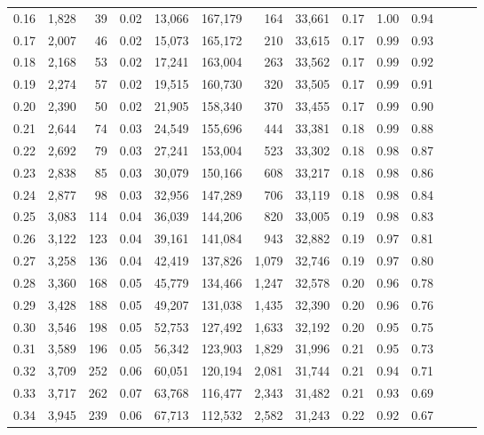 \begin{tabular}{rrrrrrrrrrrrrr}
0.16 &  1,828 &   39 &  0.02 &   13,066 &  167,179 &     164 &  33,661 &  0.17 &  1.00 &      0.94 \\
0.17 &  2,007 &   46 &  0.02 &   15,073 &  165,172 &     210 &  33,615 &  0.17 &  0.99 &      0.93 \\
0.18 &  2,168 &   53 &  0.02 &   17,241 &  163,004 &     263 &  33,562 &  0.17 &  0.99 &      0.92 \\
0.19 &  2,274 &   57 &  0.02 &   19,515 &  160,730 &     320 &  33,505 &  0.17 &  0.99 &      0.91 \\
0.20 &  2,390 &   50 &  0.02 &   21,905 &  158,340 &     370 &  33,455 &  0.17 &  0.99 &      0.90 \\
0.21 &  2,644 &   74 &  0.03 &   24,549 &  155,696 &     444 &  33,381 &  0.18 &  0.99 &      0.88 \\
0.22 &  2,692 &   79 &  0.03 &   27,241 &  153,004 &     523 &  33,302 &  0.18 &  0.98 &      0.87 \\
0.23 &  2,838 &   85 &  0.03 &   30,079 &  150,166 &     608 &  33,217 &  0.18 &  0.98 &      0.86 \\
0.24 &  2,877 &   98 &  0.03 &   32,956 &  147,289 &     706 &  33,119 &  0.18 &  0.98 &      0.84 \\
0.25 &  3,083 &  114 &  0.04 &   36,039 &  144,206 &     820 &  33,005 &  0.19 &  0.98 &      0.83 \\
0.26 &  3,122 &  123 &  0.04 &   39,161 &  141,084 &     943 &  32,882 &  0.19 &  0.97 &      0.81 \\
0.27 &  3,258 &  136 &  0.04 &   42,419 &  137,826 &   1,079 &  32,746 &  0.19 &  0.97 &      0.80 \\
0.28 &  3,360 &  168 &  0.05 &   45,779 &  134,466 &   1,247 &  32,578 &  0.20 &  0.96 &      0.78 \\
0.29 &  3,428 &  188 &  0.05 &   49,207 &  131,038 &   1,435 &  32,390 &  0.20 &  0.96 &      0.76 \\
0.30 &  3,546 &  198 &  0.05 &   52,753 &  127,492 &   1,633 &  32,192 &  0.20 &  0.95 &      0.75 \\
0.31 &  3,589 &  196 &  0.05 &   56,342 &  123,903 &   1,829 &  31,996 &  0.21 &  0.95 &      0.73 \\
0.32 &  3,709 &  252 &  0.06 &   60,051 &  120,194 &   2,081 &  31,744 &  0.21 &  0.94 &      0.71 \\
0.33 &  3,717 &  262 &  0.07 &   63,768 &  116,477 &   2,343 &  31,482 &  0.21 &  0.93 &      0.69 \\
0.34 &  3,945 &  239 &  0.06 &   67,713 &  112,532 &   2,582 &  31,243 &  0.22 &  0.92 &      0.67 \\

\end{tabular}

